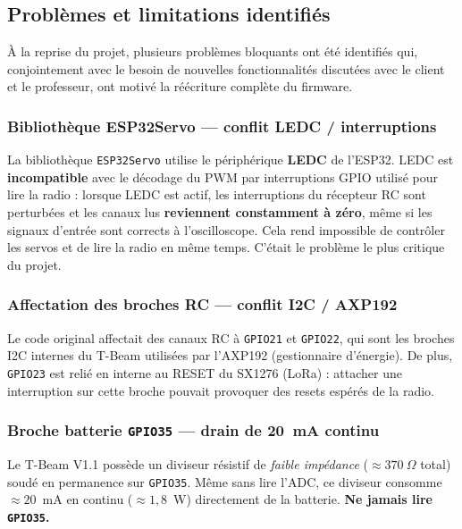 \documentclass[12pt,a4paper]{article}
\newcommand{\gpio}[1]{\texttt{GPIO#1}}
\begin{document}
\subsection{Probl\`emes et limitations identifi\'es}

À la reprise du projet, plusieurs probl\`emes bloquants ont \'et\'e identifi\'es qui,
conjointement avec le besoin de nouvelles fonctionnalit\'es discut\'ees avec le
client et le professeur, ont motiv\'e la r\'e\'ecriture compl\`ete du firmware.

\subsubsection{Biblioth\`eque ESP32Servo --- conflit LEDC / interruptions}

\begin{warningbox}
  La biblioth\`eque \texttt{ESP32Servo} utilise le p\'eriph\'erique \textbf{LEDC} de
  l'ESP32. LEDC est \textbf{incompatible} avec le d\'ecodage du PWM par interruptions
  GPIO utilis\'e pour lire la radio : lorsque LEDC est actif, les interruptions du
  r\'ecepteur RC sont perturb\'ees et les canaux lus \textbf{reviennent constamment à
  z\'ero}, m\^eme si les signaux d'entr\'ee sont corrects à l'oscilloscope. Cela rend
  impossible de contr\^oler les servos et de lire la radio en m\^eme temps. C'\'etait
  le probl\`eme le plus critique du projet.
\end{warningbox}

\subsubsection{Affectation des broches RC --- conflit I2C / AXP192}

\begin{warningbox}
  Le code original affectait des canaux RC à \gpio{21} et \gpio{22}, qui sont les
  broches I2C internes du T-Beam utilis\'ees par l'AXP192 (gestionnaire d'\'energie).
  De plus, \gpio{23} est reli\'e en interne au RESET du SX1276 (LoRa) : attacher une
  interruption sur cette broche pouvait provoquer des resets esp\'er\'es de la radio.
\end{warningbox}

\subsubsection{Broche batterie \gpio{35} --- drain de 20~mA continu}

Le T-Beam V1.1 poss\`ede un diviseur r\'esistif de \emph{faible imp\'edance}
($\approx370~\Omega$ total) soud\'e en permanence sur \gpio{35}. M\^eme sans lire
l'ADC, ce diviseur consomme $\approx20$~mA en continu ($\approx1{,}8$~W) directement
de la batterie. \textbf{Ne jamais lire \gpio{35}.}
\end{document}
